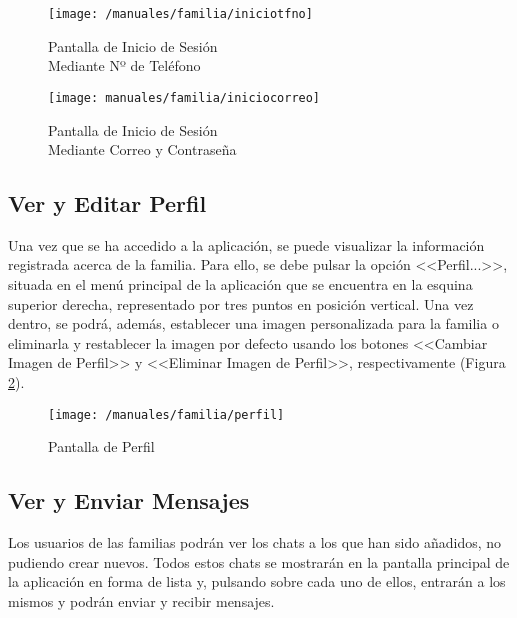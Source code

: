 \begin{figure}[!h]
	\centering
	\begin{minipage}{.5\textwidth}
		\centering
		\texttt{[image: /manuales/familia/iniciotfno]}
		\caption{Pantalla de Inicio de Sesión \\ Mediante Nº de Teléfono}
		\label{fig:iniciotfnofamilia}
	\end{minipage}%
	\begin{minipage}{.5\textwidth}
		\centering
		\texttt{[image: manuales/familia/iniciocorreo]}
		\caption{Pantalla de Inicio de Sesión \\ Mediante Correo y Contraseña}
		\label{fig:iniciocorreofamilia}
	\end{minipage}
\end{figure}

\clearpage

\subsection*{Ver y Editar Perfil}
Una vez que se ha accedido a la aplicación, se puede visualizar la información registrada acerca de la familia. Para ello, se debe pulsar la opción <<Perfil...>>, situada en el menú principal de la aplicación que se encuentra en la esquina superior derecha, representado por tres puntos en posición vertical. Una vez dentro, se podrá, además, establecer una imagen personalizada para la familia o eliminarla y restablecer la imagen por defecto usando los botones <<Cambiar Imagen de Perfil>> y <<Eliminar Imagen de Perfil>>, respectivamente (Figura \ref{fig:perfilfamilia}).

\begin{figure}[!h]
	\begin{center}
		\texttt{[image: /manuales/familia/perfil]}
		\caption{Pantalla de Perfil}
		\label{fig:perfilfamilia}
	\end{center}
\end{figure}

\clearpage

\subsection*{Ver y Enviar Mensajes}
Los usuarios de las familias podrán ver los chats a los que han sido añadidos, no pudiendo crear nuevos. Todos estos chats se mostrarán en la pantalla principal de la aplicación en forma de lista y, pulsando sobre cada uno de ellos, entrarán a los mismos y podrán enviar y recibir mensajes.

